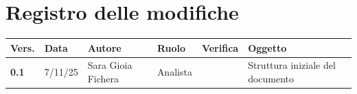 \documentclass[a4paper,12pt]{article}
\begin{document}
    

    \section*{Registro delle modifiche} {
        \begin{table}[h!]
                \begin{tabularx}{\textwidth}{|l|l|l|l|L|L|}
                \hline
                \textbf{Vers.} & \textbf{Data} & \textbf{Autore} & \textbf{Ruolo} & \textbf{Verifica} & \textbf{Oggetto} \\
                \hline
                \textbf{0.1} & 7/11/25 & Sara Gioia Fichera & Analista &  & Struttura iniziale del documento \\
                \hline
            \end{tabularx}
        \end{table}
    }
    \newpage
    
    \tableofcontents
    \newpage
    
\end{document}
